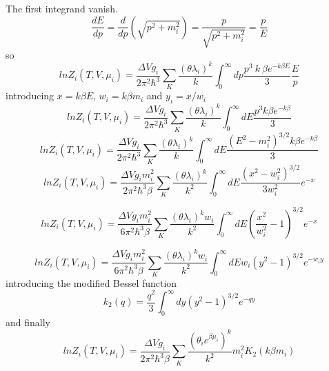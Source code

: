 \documentclass[12pt,a4paper]{book}
\begin{document}
	The first integrand vanish.
	\begin{equation}
		\frac{dE}{dp} = \frac{d}{dp} (\sqrt{p^2+m_i^2}) = \frac{p}{\sqrt{p^2+m_i^2}} = \frac{p}{E}
	\end{equation}
	so
	\begin{equation}
		ln Z_i(T,V,\mu_i)= \frac{\Delta V g_i}{2\pi^2\hbar^3} \sum_{K} \frac{(\theta \lambda_i)^k}{k}  \int_{0}^{\infty} dp \frac{p^3 \  k \  \beta e^{-k \beta E}}{3} \frac{E}{p} 
	\end{equation}
	introducing $x= k\beta E$, $w_i=k\beta m_i$ and $y_i=x/w_i$
	\begin{equation}
		ln Z_i(T,V,\mu_i)= \frac{\Delta V g_i}{2\pi^2\hbar^3} \sum_{K} \frac{(\theta \lambda_i)^k}{k}  \int_{0}^{\infty} dE \frac{p^3 k \beta e^{-k \beta}}{3} 
	\end{equation}
	\begin{equation}
		ln Z_i(T,V,\mu_i)= \frac{\Delta V g_i}{2\pi^2\hbar^3} \sum_{K} \frac{(\theta \lambda_i)^k}{k}  \int_{0}^{\infty} dE \frac{(E^2-m_i^2)^{3/2} k \beta e^{-k \beta}}{3} 
	\end{equation}
	\begin{equation}
		ln Z_i(T,V,\mu_i)= \frac{\Delta V g_i m_i^2}{2\pi^2\hbar^3 \beta} \sum_{K} \frac{(\theta \lambda_i)^k}{k^2}  \int_{0}^{\infty} dE \frac{(x^2-w_i^2)^{3/2}}{3 w_i^2} e^{-x} 
	\end{equation}
	
	\begin{equation}
		ln Z_i(T,V,\mu_i)= \frac{\Delta V g_i m_i^2}{6 \pi^2\hbar^3 \beta} \sum_{K} \frac{(\theta \lambda_i)^k w_i}{k^2}  \int_{0}^{\infty} dE (\frac{x^2}{w_i^2}-1)^{3/2} e^{-x} 
	\end{equation}
	
	\begin{equation}
		ln Z_i(T,V,\mu_i)= \frac{\Delta V g_i m_i^2}{6 \pi^2\hbar^3 \beta} \sum_{K} \frac{(\theta \lambda_i)^k w_i}{k^2}  \int_{0}^{\infty} dE w_i (y^2-1)^{3/2} e^{-w_i y} 
	\end{equation}
	introducing the modified Bessel function 
	\begin{equation}
		k_2(q)= \frac{q^2}{3} \int_{0}^{\infty} dy (y^2-1)^{3/2} e^{-qy}
	\end{equation}
	and finally 
	\begin{equation}
		ln Z_i(T,V,\mu_i)= \frac{\Delta V g_i}{2\pi^2\hbar^3\beta} \sum_{K} \frac{(\theta_i e^{\beta \mu_i})^k}{k^2} m_i^2K_2(k\beta m_i)
	\end{equation} \cite{amsdottorato9036}
	
	\printbibliography	
\end{document}
